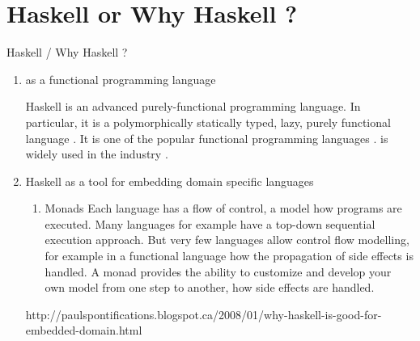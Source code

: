 \documentclass[proposal.tex]{subfiles}
\begin{document}
\section{Haskell or Why Haskell ?}\label{sect:hwh}









Haskell / Why Haskell ?
\begin{enumerate}
\item {} as a functional programming language

Haskell is an advanced purely-functional programming language. In particular, it is a polymorphically statically typed, lazy, purely 
functional language \cite{website:haskellwiki}. It is one of the popular functional programming languages \cite{website:langpop}. 
 is widely used in the industry \cite{website:haskellinindustry}. 






   
















\item Haskell as a tool for embedding domain specific languages


\begin{enumerate}
\item Monads
\newline  
Each language has a flow of control, a model how programs are executed. Many languages for example  have a top-down 
sequential execution approach. But very few languages allow control flow modelling, for example in a functional language how the 
propagation of side effects is handled. A monad provides the ability to customize and develop your own model from one step to another, how 
side effects are handled.         

\end{enumerate}

http://paulspontifications.blogspot.ca/2008/01/why-haskell-is-good-for-embedded-domain.html







\end{enumerate}
\end{document}
